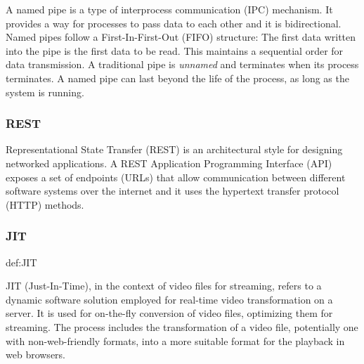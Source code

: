 \documentclass[../MasterThesis.tex]{subfiles}
\begin{document}
A named pipe is a type of interprocess communication (IPC) mechanism. It provides a way for processes to pass data to each other and it is bidirectional. 
Named pipes follow a First-In-First-Out (FIFO) structure: The first data written into the pipe is the first data to be read. This maintains a sequential order for data transmission.
A traditional pipe is \textit{unnamed} and terminates when its process terminates. A named pipe can last beyond the life of the process, as long as the system is running.~\cite{namedpipe}









\subsubsection*{REST} 


Representational State Transfer (REST) is an architectural style for designing networked applications. A REST Application Programming Interface (API) exposes a set of endpoints (URLs) that allow communication between different software systems over the internet and it uses the hypertext transfer protocol (HTTP) methods.~\cite{IEEE_Rest, webservice, Nodejs_Rest}











\subsubsection*{JIT} 
%
\begin{CountingDefinition}[JIT]{def:JIT}
	
	JIT (Just-In-Time), in the context of video files for streaming, refers to a dynamic software solution employed for real-time video transformation on a server. It is used for on-the-fly conversion of video files, optimizing them for streaming. The process includes the transformation of a video file, potentially one with non-web-friendly formats, into a more suitable format for the playback in web browsers.
	
\end{CountingDefinition}






	
	
	
	
\end{document}
